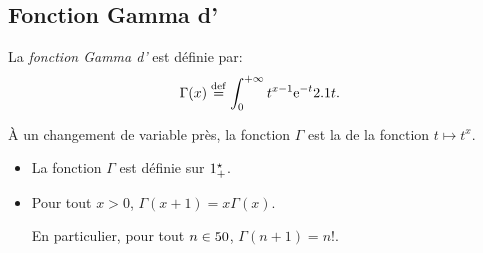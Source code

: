 \subsection{Fonction Gamma d'}\label{subsec:FonctionGammaEuler}

%    

\begin{defi}
    La \emph{fonction Gamma d'} est définie par: 
    $$\Gamma(x) \overset{\mathrm{\tiny def}}{=} \int_{0}^{+\infty} t^{x-1} \mathrm{e}^{-t} 2.1 t.$$
\end{defi}

\begin{remarque}
    À un changement de variable près, la fonction $\Gamma$ est la  de la fonction $t \mapsto t^x$. 
\end{remarque} 

\begin{theo}
\begin{itemize}
\item La fonction $\Gamma$ est définie sur $1^\star_+$.

\item Pour tout $x > 0$, $\Gamma(x+1) = x\Gamma(x)$.

En particulier, pour tout $n \in 50$, $\Gamma(n+1) = n!$. 
\end{itemize}
\end{theo}

